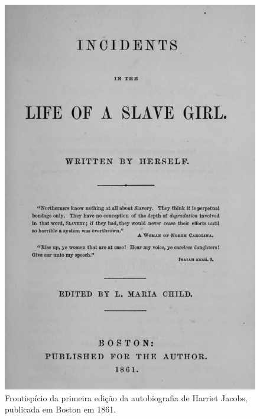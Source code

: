 

\movetoevenpage
\thispagestyle{empty}
\begin{absolutelynopagebreak}
\begin{vplace}
\begin{figure}[H]
\begin{adjustwidth}{-1.40cm}{}
  \centering
  \vspace*{-2.4cm}
  \includegraphics[width=125mm]{./imgs/front.jpg}  
\end{adjustwidth}
  \caption{Frontispício da primeira edição da autobiografia de Harriet Jacobs, publicada em Boston em 1861.}
\end{figure}
\end{vplace}

\thispagestyle{empty}
\end{absolutelynopagebreak}

